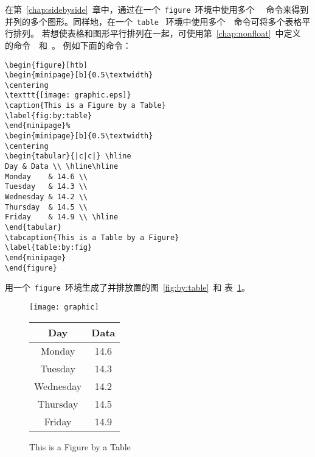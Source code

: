 在第~\ref{chap:sidebyside}~章中，通过在一个~\texttt{figure}~环境中使用多个
~~命令来得到并列的多个图形。同样地，在一个~\texttt{table}~
环境中使用多个~~命令可将多个表格平行排列。
若想使表格和图形平行排列在一起，可使用第~\ref{chap:nonfloat}~中定义
的命令~~和~。
例如下面的命令：
\begin{Verbatim}[xleftmargin=1cm]
\begin{figure}[htb] 
\begin{minipage}[b]{0.5\textwidth} 
\centering 
\texttt{[image: graphic.eps]} 
\caption{This is a Figure by a Table} 
\label{fig:by:table} 
\end{minipage}% 
\begin{minipage}[b]{0.5\textwidth} 
\centering
\begin{tabular}{|c|c|} \hline 
Day & Data \\ \hline\hline 
Monday    & 14.6 \\ 
Tuesday   & 14.3 \\ 
Wednesday & 14.2 \\ 
Thursday  & 14.5 \\ 
Friday    & 14.9 \\ \hline 
\end{tabular} 
\tabcaption{This is a Table by a Figure} 
\label{table:by:fig} 
\end{minipage} 
\end{figure}
\end{Verbatim}
用一个~\texttt{figure}~环境生成了并排放置的图~\ref{fig:by:table}~和
表~\ref{table:by:fig}。

\begin{figure}[htb]
	\begin{minipage}[b]{0.5\textwidth}
		\centering
		\texttt{[image: graphic]} 
		\caption{This is a Figure by a Table} 
		\label{fig:by:table} 
	\end{minipage}%
	\begin{minipage}[b]{0.5\textwidth} 
		\centering
		\begin{tabular}{|c|c|} \hline
			Day & Data \\ \hline\hline
			Monday    & 14.6 \\ 
			Tuesday   & 14.3 \\
			Wednesday & 14.2 \\ 
			Thursday  & 14.5 \\ 
			Friday    & 14.9 \\ \hline
		\end{tabular}
		\label{table:by:fig} 
	\end{minipage} 
\end{figure}


